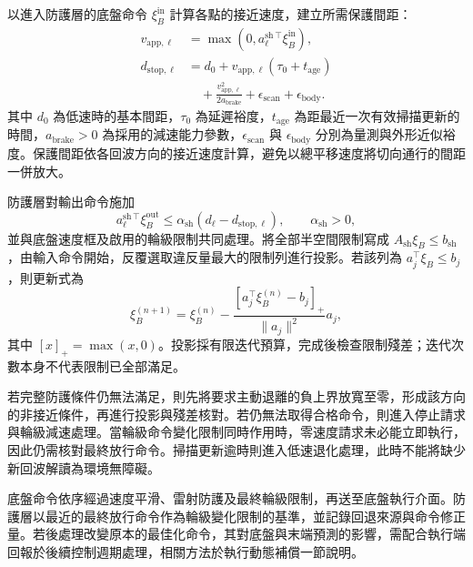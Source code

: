 以進入防護層的底盤命令 $\xi_B^{\mathrm{in}}$ 計算各點的接近速度，建立所需保護間距：
\begin{equation}
    \begin{aligned}
        v_{\mathrm{app},\ell}
        &=\max\!\left(0,
          a_{\ell}^{\mathrm{sh}\,\top}\xi_B^{\mathrm{in}}\right), \\
        d_{\mathrm{stop},\ell}
        &=d_0+v_{\mathrm{app},\ell}(\tau_0+t_{\mathrm{age}}) \\
        &\quad+\frac{v_{\mathrm{app},\ell}^{2}}{2a_{\mathrm{brake}}}
          +\epsilon_{\mathrm{scan}}+\epsilon_{\mathrm{body}}.
    \end{aligned}
    \label{eq:ch3_scan_stopping_distance}
\end{equation}
其中 $d_0$ 為低速時的基本間距，$\tau_0$ 為延遲裕度，$t_{\mathrm{age}}$ 為距最近一次有效掃描更新的時間，$a_{\mathrm{brake}}>0$ 為採用的減速能力參數，$\epsilon_{\mathrm{scan}}$ 與 $\epsilon_{\mathrm{body}}$ 分別為量測與外形近似裕度。保護間距依各回波方向的接近速度計算，避免以總平移速度將切向通行的間距一併放大。

防護層對輸出命令施加
\begin{equation}
    a_{\ell}^{\mathrm{sh}\,\top}\xi_B^{\mathrm{out}}
    \leq\alpha_{\mathrm{sh}}
          (d_{\ell}-d_{\mathrm{stop},\ell}),
    \qquad \alpha_{\mathrm{sh}}>0,
    \label{eq:ch3_scan_protection_constraint}
\end{equation}
並與底盤速度框及啟用的輪級限制共同處理。將全部半空間限制寫成 $A_{\mathrm{sh}}\xi_B\leq b_{\mathrm{sh}}$，由輸入命令開始，反覆選取違反量最大的限制列進行投影。若該列為 $a_j^{\top}\xi_B\leq b_j$，則更新式為
\begin{equation}
    \xi_B^{(n+1)}
    =\xi_B^{(n)}
     -\frac{\left[a_j^{\top}\xi_B^{(n)}-b_j\right]_{+}}
            {\|a_j\|^2}a_j,
    \label{eq:ch3_scan_halfspace_projection}
\end{equation}
其中 $[x]_{+}=\max(x,0)$。投影採有限迭代預算，完成後檢查限制殘差；迭代次數本身不代表限制已全部滿足。

若完整防護條件仍無法滿足，則先將要求主動退離的負上界放寬至零，形成該方向的非接近條件，再進行投影與殘差核對。若仍無法取得合格命令，則進入停止請求與輪級減速處理。當輪級命令變化限制同時作用時，零速度請求未必能立即執行，因此仍需核對最終放行命令。掃描更新逾時則進入低速退化處理，此時不能將缺少新回波解讀為環境無障礙。

底盤命令依序經過速度平滑、雷射防護及最終輪級限制，再送至底盤執行介面。防護層以最近的最終放行命令作為輪級變化限制的基準，並記錄回退來源與命令修正量。若後處理改變原本的最佳化命令，其對底盤與末端預測的影響，需配合執行端回報於後續控制週期處理，相關方法於執行動態補償一節說明。

